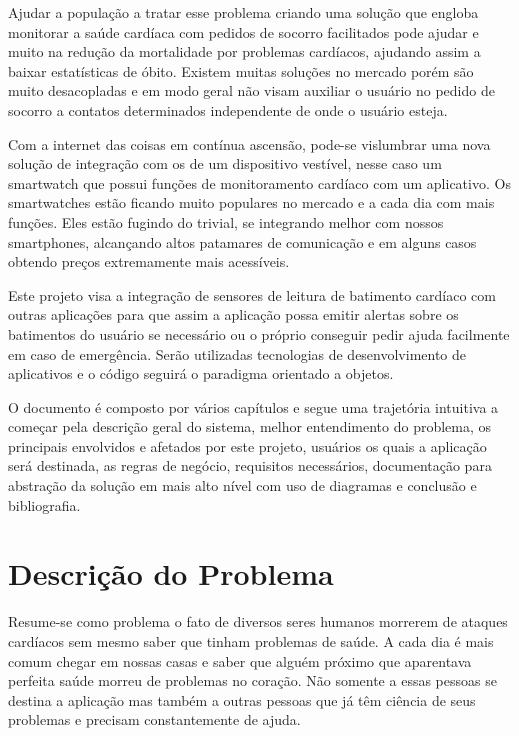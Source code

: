 \documentclass[
	12pt,				%
	openright,			%
	twoside,			%
	a4paper,			%
	english,			%
	french,				%
	spanish,			%
	brazil				%
]{abntex2}
\begin{document}
Ajudar a população a tratar esse problema criando uma solução que engloba monitorar a saúde cardíaca com pedidos de socorro facilitados pode ajudar e muito na redução da mortalidade por problemas cardíacos, ajudando assim a baixar estatísticas de óbito. Existem muitas soluções no mercado porém são muito desacopladas e em modo geral não visam auxiliar o usuário no pedido de socorro a contatos determinados independente de onde o usuário esteja.

Com a internet das coisas em contínua ascensão, pode-se vislumbrar uma nova solução de integração com os de um dispositivo vestível, nesse caso um smartwatch que possui funções de monitoramento cardíaco com um aplicativo. Os smartwatches estão ficando muito populares no mercado e a cada dia com mais funções. Eles estão fugindo do trivial, se integrando melhor com nossos smartphones, alcançando altos patamares de comunicação e em alguns casos obtendo preços extremamente mais acessíveis.

Este projeto visa a integração de sensores de leitura de batimento cardíaco com outras aplicações para que assim a aplicação possa emitir alertas sobre os batimentos do usuário se necessário ou o próprio conseguir pedir ajuda facilmente em caso de emergência. Serão utilizadas tecnologias de desenvolvimento de aplicativos e o código seguirá o paradigma orientado a objetos.

O documento é composto por vários capítulos e segue uma trajetória intuitiva a começar pela descrição geral do sistema, melhor entendimento do problema, os principais envolvidos e afetados por este projeto, usuários os quais a aplicação será destinada, as regras de negócio, requisitos necessários, documentação para abstração da solução em mais alto nível com uso de diagramas e conclusão e bibliografia.

\chapter{Descrição do Problema}

Resume-se como problema o fato de diversos seres humanos morrerem de ataques cardíacos sem mesmo saber que tinham problemas de saúde. A cada dia é mais comum chegar em nossas casas e saber que alguém próximo que aparentava perfeita saúde morreu de problemas no coração. Não somente a essas pessoas se destina a aplicação mas também a outras pessoas que já têm ciência de seus problemas e precisam constantemente de ajuda.
\end{document}
